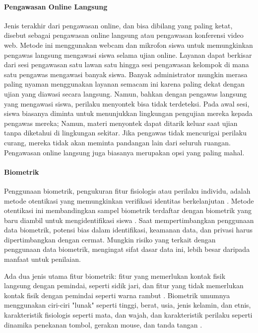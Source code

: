 \paragraph{Pengawasan Online Langsung}
\label{par:pengawasanonlinelangsung}

Jenis terakhir dari pengawasan online, dan bisa dibilang yang paling ketat, disebut sebagai pengawasan online langsung atau pengawasan konferensi video web. Metode ini menggunakan webcam dan mikrofon siswa untuk memungkinkan pengawas langsung mengawasi siswa selama ujian online. Layanan dapat berkisar dari sesi pengawasan satu lawan satu hingga sesi pengawasan kelompok di mana satu pengawas mengawasi banyak siswa. Banyak administrator mungkin merasa paling nyaman menggunakan layanan semacam ini karena paling dekat dengan ujian yang diawasi secara langsung. Namun, bahkan dengan pengawas langsung yang mengawasi siswa, perilaku menyontek bisa tidak terdeteksi. Pada awal sesi, siswa biasanya diminta untuk menunjukkan lingkungan pengujian mereka kepada pengawas mereka; Namun, materi menyontek dapat ditarik keluar saat ujian tanpa diketahui di lingkungan sekitar. Jika pengawas tidak mencurigai perilaku curang, mereka tidak akan meminta pandangan lain dari seluruh ruangan. Pengawasan online langsung juga biasanya merupakan opsi yang paling mahal.

\paragraph{Biometrik}
\label{par:biometrik}

Penggunaan biometrik, pengukuran fitur fisiologis atau perilaku individu, adalah metode otentikasi yang memungkinkan verifikasi identitas berkelanjutan \citep{rabuzin2006learning} \citep{cote2016video}. Metode otentikasi ini membandingkan sampel biometrik terdaftar dengan biometrik yang baru diambil untuk mengidentifikasi siswa \citep{podio2001biometric}. Saat mempertimbangkan penggunaan data biometrik, potensi bias dalam identifikasi, keamanan data, dan privasi harus dipertimbangkan dengan cermat. Mungkin risiko yang terkait dengan penggunaan data biometrik, mengingat sifat dasar data ini, lebih besar daripada manfaat untuk penilaian.

Ada dua jenis utama fitur biometrik: fitur yang memerlukan kontak fisik langsung dengan pemindai, seperti sidik jari, dan fitur yang tidak memerlukan kontak fisik dengan pemindai seperti warna rambut \citep{rabuzin2006learning}. Biometrik umumnya menggunakan ciri-ciri "lunak" seperti tinggi, berat, usia, jenis kelamin, dan etnis, karakteristik fisiologis seperti mata, dan wajah, dan karakteristik perilaku seperti dinamika penekanan tombol, gerakan mouse, dan tanda tangan \citep{cerimagic2019online} \citep{rabuzin2006learning}.

